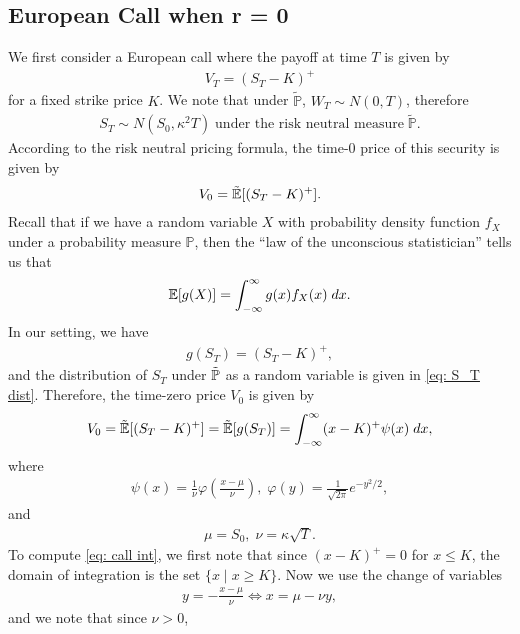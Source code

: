 \documentclass[reqno]{amsart}
\begin{document}
\subsection{European Call when r = 0}
We first consider a European call where the payoff at time $T$ is given by 
\begin{align}
	 V_T = (S_T - K)^+
\end{align}
for a fixed strike price $K$. We note that under $\tilde{\mathbb{P}}$, $ W_T \sim N(0, T)$, therefore
\begin{align}\label{eq: S_T dist}
S_T \sim N(S_0, \kappa^2T) \; \text{under the risk neutral measure} \; \tilde{\mathbb{P}}.
\end{align}
According to the risk neutral pricing formula, the time-0 price of this security is given by 
\begin{align}
	 V_0 = \tilde{\mathbb{E}}[(S_T - K)^+].
\end{align}
Recall that if we have a random variable $X$ with probability density function $f_X$ under a probability measure $\mathbb{P}$, then the ``law of the unconscious statistician'' tells us that 
\begin{align}
	 \mathbb{E}[g(X)] = \int_{-\infty}^\infty g(x) f_X(x) \; dx.
\end{align}
In our setting, we have 
\begin{align}
	 g(S_T) = (S_T - K)^+,
\end{align}
and the distribution of $S_T$ under $\tilde{\mathbb{P}}$ as a random variable is given in \eqref{eq: S_T dist}. Therefore, the time-zero price $V_0$ is given by 
\begin{align}\label{eq: call int}
	 V_0 = \tilde{\mathbb{E}}[(S_T - K)^+] =  \tilde{\mathbb{E}}[g(S_T)] = \int_{-\infty}^\infty (x-K)^+ \psi(x) \; dx,
\end{align}
where 
\begin{align}
	 \psi(x) = \frac{1}{\nu}\varphi\left(\frac{x-\mu}{\nu}\right), \; \varphi(y) = \frac{1}{\sqrt{2\pi}}e^{-y^2/2}, 
\end{align}
and
\begin{align}
	 \mu = S_0, \; \nu = \kappa \sqrt{T}.
\end{align}
To compute \eqref{eq: call int}, we first note that since $(x-K)^+ = 0$ for $x \le K$, the domain of integration is the set $\{x \mid x \ge K\}$. Now we use the change of variables 
\begin{align}
	 y = -\frac{x-\mu}{\nu} \Longleftrightarrow x = \mu - \nu y,
\end{align}
and we note that since $\nu > 0$, 
\end{document}
